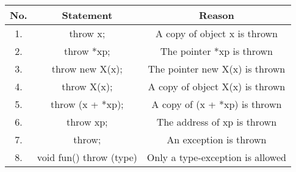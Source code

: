 \documentclass[11pt]{article}
\begin{document}
\begin{tabular}{|c|c|c|}
\hline
No. & Statement & Reason \\ \hline
1. & throw x; & A copy of object x is thrown \\ \hline
2. & throw *xp; & The pointer *xp is thrown \\ \hline
3. & throw new X(x); & The pointer new X(x) is thrown \\ \hline
4. & throw X(x); & A copy of object X(x) is thrown \\ \hline
5. & throw (x + *xp); & A copy of (x + *xp) is thrown \\ \hline
6. & throw xp; & The address of xp is thrown \\ \hline
7. & throw; & An exception is thrown \\ \hline
8. & void fun() throw (type) & Only a type-exception is allowed \\ \hline
\end{tabular}
\end{document}
